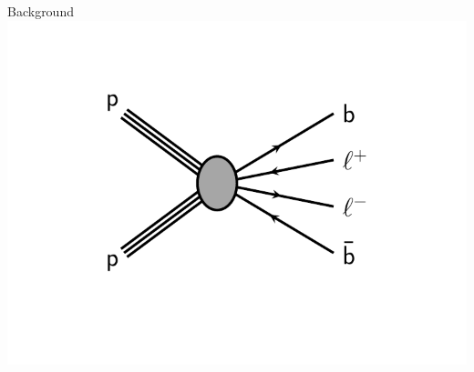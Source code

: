 \documentclass[10pt, svgnames]{beamer}
\begin{document}
\begin{frame}
\begin{columns}
\begin{block}{Background}
      \includegraphics[width=\textwidth]{figures/generic_bbll.pdf}
    \end{block}
  \end{columns}
\end{frame}
\end{document}
